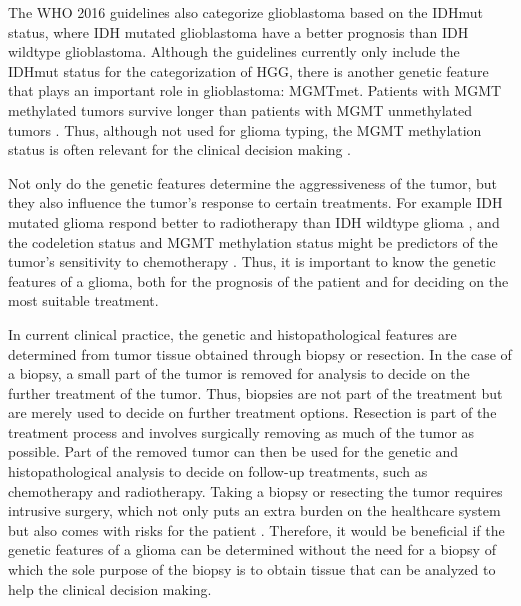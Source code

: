 The \gls{WHO} 2016 guidelines also categorize \gls{glioblastoma} based on the \gls{IDHmut} status, where \gls{IDH} mutated \gls{glioblastoma} have a better prognosis than \gls{IDH} wildtype \gls{glioblastoma}.
Although the guidelines currently only include the \gls{IDHmut} status for the categorization of \gls{HGG}, there is another genetic feature that plays an important role in \gls{glioblastoma}: \gls{MGMTmet}.
Patients with \gls{MGMT} methylated \glspl{tumor} survive longer than patients with \gls{MGMT} unmethylated \glspl{tumor} \autocite{martinez2007MGMT, gessler2018MGMT, weller2009molecularGBM}.
Thus, although not used for \gls{glioma} typing, the \gls{MGMT} methylation status is often relevant for the clinical decision making \autocite{molinaro2019geneticepidemiology}.

Not only do the genetic features determine the aggressiveness of the \gls{tumor}, but they also influence the \gls{tumor}'s response to certain treatments.
For example \gls{IDH} mutated \gls{glioma} respond better to radiotherapy than \gls{IDH} wildtype \gls{glioma} \autocite{juratli2015IDHtreatment}, and the \gls{codeletion} status and \gls{MGMT} methylation status might be predictors of the \gls{tumor}'s sensitivity to chemotherapy \autocite{idbaih2007markersresponse}.
Thus, it is important to know the genetic features of a \gls{glioma}, both for the prognosis of the patient and for deciding on the most suitable treatment.

In current clinical practice, the genetic and histopathological features are determined from \gls{tumor} tissue obtained through biopsy or resection.
In the case of a biopsy, a small part of the \gls{tumor} is removed for analysis to decide on the further treatment of the \gls{tumor}.
Thus, biopsies are not part of the treatment but are merely used to decide on further treatment options.
Resection is part of the treatment process and involves surgically removing as much of the \gls{tumor} as possible.
Part of the removed \gls{tumor} can then be used for the genetic and histopathological analysis to decide on follow-up treatments, such as chemotherapy and radiotherapy.
Taking a biopsy or resecting the \gls{tumor} requires intrusive surgery, which not only puts an extra burden on the healthcare system but also comes with risks for the patient \autocite{chen2009biopsy}.
Therefore, it would be beneficial if the genetic features of a \gls{glioma} can be determined without the need for a biopsy of which the sole purpose of the biopsy is to obtain tissue that can be analyzed to help the clinical decision making.

